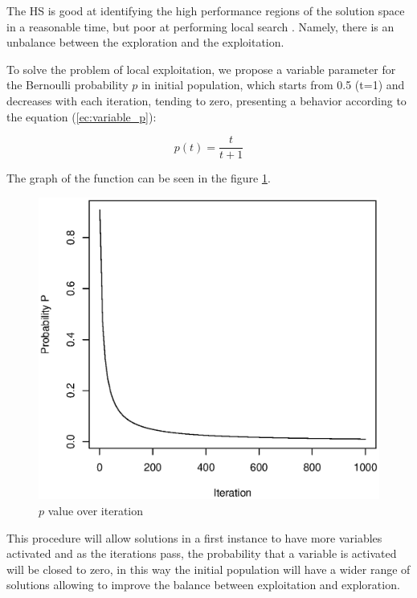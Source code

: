 The HS is good at identifying the high performance regions of the solution space in a reasonable time, but poor at performing local search \cite{DBLP:journals/eswa/XiangALHZ14}. Namely, there is an unbalance between the exploration and the exploitation. 
 
To solve the problem of local exploitation, we propose a variable parameter for the Bernoulli probability $p$ in initial population, which starts from 0.5 (t=1) and decreases with each iteration, tending to zero, presenting a behavior according to the equation (\ref{ec:variable_p}):

\begin{equation} \label{ec:variable_p} 
p(t) = \frac{t}{t+1}
\end{equation}	

The graph of the function can be seen in the figure \ref{fig:pvalue}.\\

\begin{figure}[H]
\centering
\includegraphics[scale=.35]{Implementacion/img/p_bernoulli.eps}
\caption{$p$ value over iteration}
\label{fig:pvalue}
\end{figure}

This procedure will allow solutions in a first instance to have more variables activated and as the iterations pass, the probability that a variable is activated will be closed to zero, in this way the initial population will have a wider range of solutions allowing to improve the balance between exploitation and exploration.

